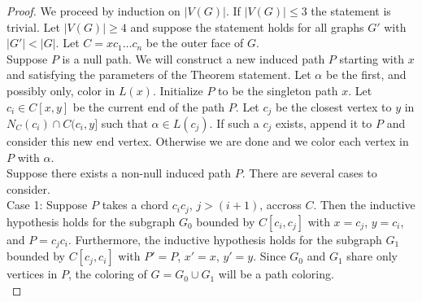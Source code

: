 \documentclass[11pt,letter]{article}
\begin{document}
\begin{proof}
We proceed by induction on $|V(G)|$. If $|V(G)|\le3$ the statement is trivial. Let $|V(G)|\ge4$ and suppose the
statement holds for all graphs $G'$ with $|G'|<|G|$. Let $C=xc_1\ldots c_{n}$ be the outer face of $G$.\\

\noindent Suppose $P$ is a null path. We will construct a new induced path $P$ starting with $x$ and
satisfying the parameters of the Theorem statement. Let $\alpha$ be
the first, and possibly only, color in $L(x)$.
Initialize $P$ to be the singleton path $x$. Let $c_i\in C[x,y]$ be the current end of the path $P$.
Let $c_j$ be the closest vertex to $y$ in $N_C(c_i)\cap C(c_i,y]$ such that $\alpha\in L(c_j)$. If such a
$c_j$ exists, append it to $P$ and consider this new end vertex. Otherwise we are done and we color each
vertex in $P$ with $\alpha$.\\

\noindent Suppose there exists a non-null induced path $P$. There are several cases to consider.\\

\noindent Case 1: Suppose $P$ takes a chord $c_ic_j$,
$j>(i+1)$, accross $C$. Then the inductive hypothesis holds for the subgraph $G_0$
bounded by $C[c_i,c_j]$ with $x=c_j$, $y=c_i$, and $P=c_jc_i$. Furthermore, the inductive hypothesis
holds for the subgraph $G_1$ bounded by $C[c_j,c_i]$ with $P'=P$, $x'=x$, $y'=y$. Since $G_0$ and $G_1$
share only vertices in $P$, the coloring of $G=G_0\cup G_1$ will be a path coloring.\\


\end{proof}
\end{document}

